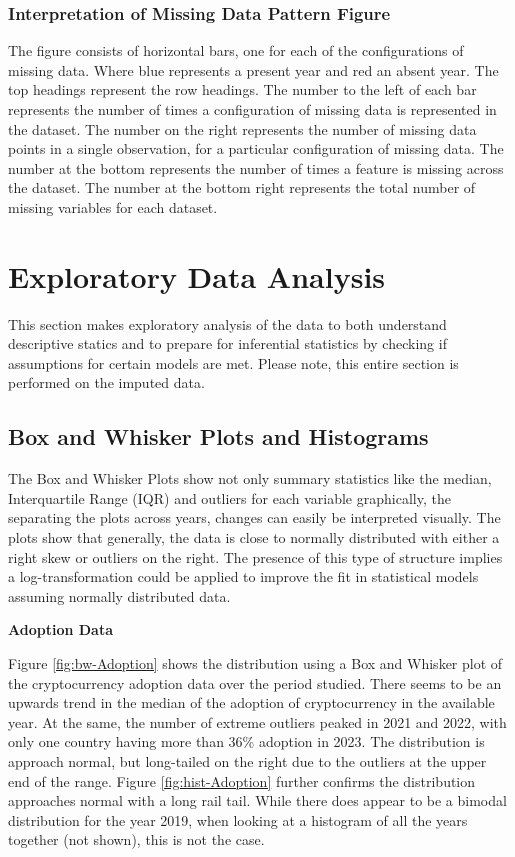 \documentclass[
]{article}
\begin{document}
\subsubsection{Interpretation of Missing Data Pattern Figure}\label{interpretation-of-missing-data-pattern-figure}

The figure consists of horizontal bars, one for each of the configurations of missing data. Where blue represents a present year and red an absent year. The top headings represent the row headings. The number to the left of each bar represents the number of times a configuration of missing data is represented in the dataset. The number on the right represents the number of missing data points in a single observation, for a particular configuration of missing data. The number at the bottom represents the number of times a feature is missing across the dataset. The number at the bottom right represents the total number of missing variables for each dataset.

\newpage

\section{Exploratory Data Analysis}\label{exploratory-data-analysis}

This section makes exploratory analysis of the data to both understand descriptive statics and to prepare for inferential statistics by checking if assumptions for certain models are met. Please note, this entire section is performed on the imputed data.

\subsection{Box and Whisker Plots and Histograms}\label{box-and-whisker-plots-and-histograms}

The Box and Whisker Plots show not only summary statistics like the median, Interquartile Range (IQR) and outliers for each variable graphically, the separating the plots across years, changes can easily be interpreted visually. The plots show that generally, the data is close to normally distributed with either a right skew or outliers on the right. The presence of this type of structure implies a log-transformation could be applied to improve the fit in statistical models assuming normally distributed data.

\textbf{Adoption Data}

Figure \ref{fig:bw-Adoption} shows the distribution using a Box and Whisker plot of the cryptocurrency adoption data over the period studied. There seems to be an upwards trend in the median of the adoption of cryptocurrency in the available year. At the same, the number of extreme outliers peaked in 2021 and 2022, with only one country having more than 36\% adoption in 2023. The distribution is approach normal, but long-tailed on the right due to the outliers at the upper end of the range. Figure \ref{fig:hist-Adoption} further confirms the distribution approaches normal with a long rail tail. While there does appear to be a bimodal distribution for the year 2019, when looking at a histogram of all the years together (not shown), this is not the case.
\end{document}
